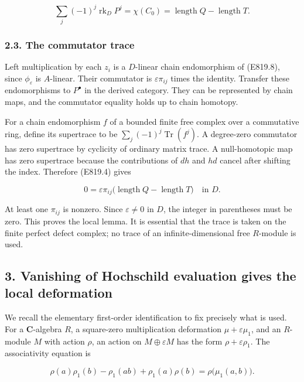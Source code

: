 \[
 \sum_j(-1)^j\operatorname{rk}_D P^j
  =\chi(C_0)=\operatorname{length}Q-\operatorname{length}T.
 \tag{E819.9}
\]

\subsubsection{2.3. The commutator trace}\label{SF-E819-the-commutator-trace}

Left multiplication by each \(z_i\) is a \(D\)-linear chain endomorphism
of (E819.8), since \(\phi_\varepsilon\) is \(A\)-linear. Their
commutator is \(\varepsilon\pi_{ij}\) times the identity. Transfer these
endomorphisms to \(P^\bullet\) in the derived category. They can be
represented by chain maps, and the commutator equality holds up to chain
homotopy.

For a chain endomorphism \(f\) of a bounded finite free complex over a
commutative ring, define its supertrace to be
\(\sum_j(-1)^j\operatorname{Tr}(f^j)\). A degree-zero commutator has
zero supertrace by cyclicity of ordinary matrix trace. A null-homotopic
map has zero supertrace because the contributions of \(dh\) and \(hd\)
cancel after shifting the index. Therefore (E819.4) gives

\[
 0=\varepsilon\pi_{ij}
       \bigl(\operatorname{length}Q-\operatorname{length}T\bigr)
       \quad\text{in }D.
 \tag{E819.10}
\]

At least one \(\pi_{ij}\) is nonzero. Since \(\varepsilon\ne0\) in
\(D\), the integer in parentheses must be zero. This proves the local
lemma. It is essential that the trace is taken on the finite perfect
defect complex; no trace of an infinite-dimensional free \(R\)-module is
used.

\subsection{3. Vanishing of Hochschild evaluation gives the local
deformation}\label{SF-E819-vanishing-of-hochschild-evaluation-gives-the-local-deformation}

We recall the elementary first-order identification to fix precisely
what is used. For a \(\mathbf C\)-algebra \(R\), a square-zero
multiplication deformation \(\mu+\varepsilon\mu_1\), and an \(R\)-module
\(M\) with action \(\rho\), an action on \(M\oplus\varepsilon M\) has
the form \(\rho+\varepsilon\rho_1\). The associativity equation is

\[
 \rho(a)\rho_1(b)-\rho_1(ab)+\rho_1(a)\rho(b)
       =\rho\bigl(\mu_1(a,b)\bigr).
 \tag{E819.11}
\]

